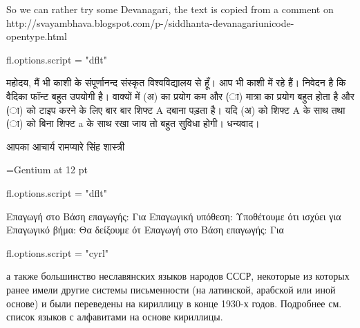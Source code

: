 \documentclass{article}
\begin{document}
\siddhanta
So we can rather try some Devanagari, the text is copied from a comment on http://svayambhava.\-blogspot.com\-/p\--/\-sidd\-hanta-\-deva\-na\-ga\-ri\-unicode-\-open\-type.html

\begin{luacode*}
fl.options.script = "dflt"
\end{luacode*}

महोदय,
मैं भी काशी के संपूर्णानन्द संस्कृत विश्वविद्यालय से हूँ। आप भी काशी में रहे हैं।
निवेदन है कि वैदिका फॉन्ट बहुत उपयोगी है। वाक्यों में (अ) का प्रयोग कम और (ा) मात्रा का प्रयोग बहुत होता है और (ा) को टाइप करने के लिए बार बार शिफ्ट A दबाना पड़ता है। यदि (अ) को शिफ्ट A के साथ तथा (ा) को बिना शिफ्ट a के साथ रखा जाय तो बहुत सुविधा होगी।
धन्यवाद।

आपका
आचार्य रामप्यारे सिंह शास्त्री

\font\gentium={Gentium} at 12 pt
\gentium
\begin{luacode*}
fl.options.script = "dflt"
\end{luacode*}
Επαγωγή στο 
Βάση επαγωγής: Για 
Επαγωγική υπόθεση: Υποθέτουμε ότι ισχύει για 
Επαγωγικό βήμα: Θα δείξουμε ότ
Επαγωγή στο
Βάση επαγωγής: Για 

\gentium
\begin{luacode*}
fl.options.script = "cyrl"
\end{luacode*}
а также большинство неславянских языков народов СССР, некоторые из которых
ранее имели другие системы письменности (на латинской, арабской или иной
основе) и были переведены на кириллицу в конце 1930-х годов. Подробнее см.
список языков с алфавитами на основе кириллицы.  
\end{document}
